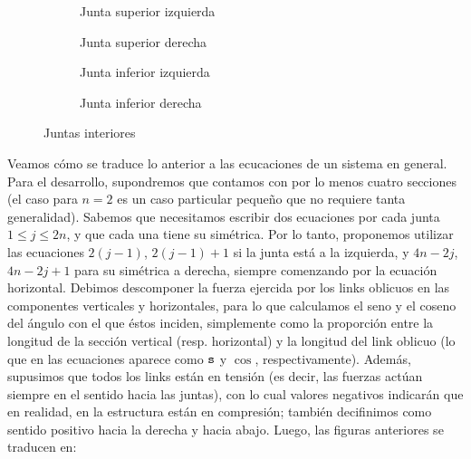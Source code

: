 \begin{figure}[!ht]
        \centering
        \begin{subfigure}[b]{0.24\textwidth}
                
                \caption{Junta superior izquierda}
                \label{fig:juntasupizq}
        \end{subfigure}
        \begin{subfigure}[b]{0.24\textwidth}
                
                \caption{Junta superior derecha}
                \label{fig:juntasupder}
        \end{subfigure}
        \begin{subfigure}[b]{0.24\textwidth}
                
                \caption{Junta inferior izquierda}
                \label{fig:juntainfizq}
        \end{subfigure}
        \begin{subfigure}[b]{0.24\textwidth}
                
                \caption{Junta inferior derecha}
                \label{fig:juntainfder}
        \end{subfigure}
        \caption{Juntas interiores}\label{fig:juntasInt}
\end{figure}

Veamos cómo se traduce lo anterior a las ecucaciones de un sistema en general. Para el desarrollo, supondremos que contamos con por lo menos cuatro secciones (el caso para $n = 2$ es un caso particular pequeño que no requiere tanta generalidad). Sabemos que necesitamos escribir dos ecuaciones por cada junta $1 \leq j \leq 2n$, y que cada una tiene su simétrica. Por lo tanto, proponemos utilizar las ecuaciones $2(j-1)$, $2(j-1)+1$ si la junta está a la izquierda, y $4n-2j$, $4n-2j+1$ para su simétrica a derecha, siempre comenzando por la ecuación horizontal. Debimos descomponer la fuerza ejercida por los links oblicuos en las componentes verticales y horizontales, para lo que calculamos el seno y el coseno del ángulo con el que éstos inciden, simplemente como la proporción entre la longitud de la sección vertical (resp. horizontal) y la longitud del link oblicuo (lo que en las ecuaciones aparece como $\mathtt{s}$ y $\cos$, respectivamente). Además, supusimos que todos los links están en tensión (es decir, las fuerzas actúan siempre en el sentido hacia las juntas), con lo cual valores negativos indicarán que en realidad, en la estructura están en compresión; también decifinimos como sentido positivo hacia la derecha y hacia abajo. Luego, las figuras anteriores se traducen en:

